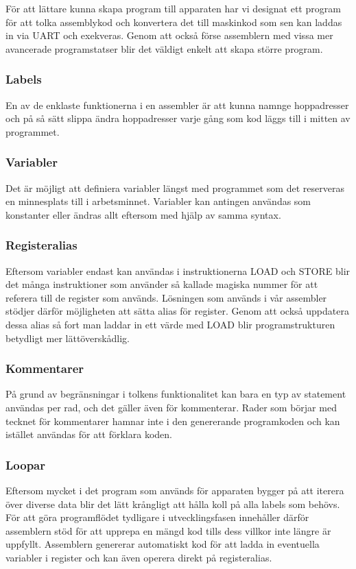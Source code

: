 \documentclass[a4paper]{article}
\begin{document}
    För att lättare kunna skapa program till apparaten har vi designat ett program
    för att tolka assemblykod och konvertera det till maskinkod som sen kan laddas
    in via UART och exekveras. Genom att också förse assemblern med vissa mer
    avancerade programstatser blir det väldigt enkelt att skapa större program. 

    \subsubsection{Labels}
    En av de enklaste funktionerna i en assembler är att kunna namnge hoppadresser
    och på så sätt slippa ändra hoppadresser varje gång som kod läggs till i mitten
    av programmet. 

    \subsubsection{Variabler}
    Det är möjligt att definiera variabler längst med programmet som det
    reserveras en minnesplats till i arbetsminnet. Variabler kan antingen
    användas som konstanter eller ändras allt eftersom med hjälp av samma
    syntax. 
    \subsubsection{Registeralias}
    Eftersom variabler endast kan användas i instruktionerna LOAD och STORE blir
    det många instruktioner som använder så kallade magiska nummer för att
    referera till de register som används. Lösningen som används i vår assembler
    stödjer därför möjligheten att sätta alias för register. Genom att också
    uppdatera dessa alias så fort man laddar in ett värde med LOAD blir
    programstrukturen betydligt mer lättöverskådlig. 
    \subsubsection{Kommentarer}
    På grund av begränsningar i tolkens funktionalitet kan bara en typ av
    statement användas per rad, och det gäller även för kommenterar. Rader som
    börjar med tecknet för kommentarer hamnar inte i den genererande
    programkoden och kan istället användas för att förklara koden. 
    \subsubsection{Loopar}
    Eftersom mycket i det program som används för apparaten bygger på att iterera över diverse data
    blir det lätt krångligt att hålla koll på alla labels som behövs. För att göra programflödet
    tydligare i utvecklingsfasen innehåller därför assemblern stöd för att upprepa en mängd kod
    tills dess villkor inte längre är uppfyllt. Assemblern genererar automatiskt kod för att ladda
    in eventuella variabler i register och kan även operera direkt på registeralias.
\end{document}
